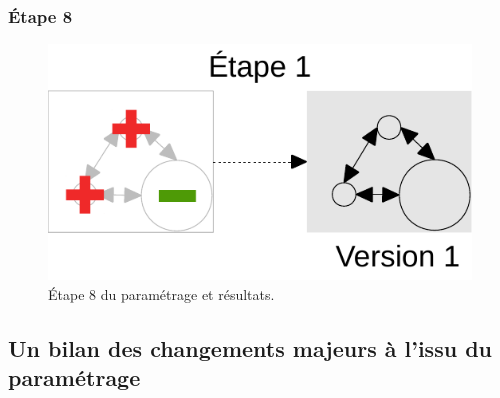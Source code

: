 \documentclass[12pt, a4paper, oneside]{book}
\begin{document}
	\subsubsection{Étape 8}
		\begin{figure}[H]
			\centering
			\includegraphics[width = \linewidth, page = 8]{img/schemas_etapes_individuelles.pdf}
			\caption{Étape 8 du paramétrage et résultats.}
		\end{figure}
	
	\pagebreak
	\subsection{Un bilan des changements majeurs à l'issu du paramétrage}
	
\end{document}
